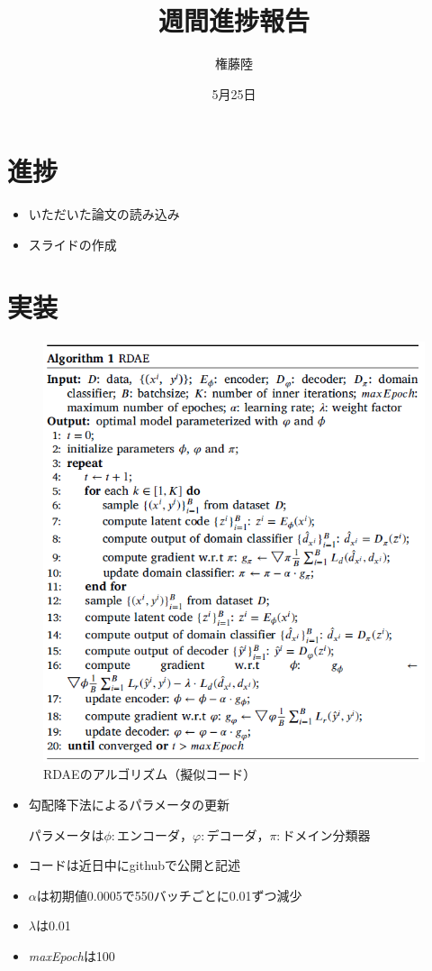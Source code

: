 \documentclass[dvipdfmx]{jsarticle}
\begin{document}
\title{週間進捗報告}
\author{権藤陸}
\date{5月25日}
\maketitle
\section{進捗}
\begin{itemize}
    \item いただいた論文の読み込み
    \item スライドの作成
\end{itemize}



\section{実装}

\begin{figure}[H]
\begin{center}
\includegraphics[width=0.6\linewidth]{./rdae_algorithm.png}
\end{center}
\caption{RDAEのアルゴリズム（擬似コード）}
\end{figure}
\begin{itemize}
    \item 勾配降下法によるパラメータの更新
    
パラメータは$\phi: エンコーダ$，$\varphi: デコーダ$，$\pi: ドメイン分類器$

    \item コードは近日中にgithubで公開と記述
    \item $\alpha$は初期値0.0005で550バッチごとに0.01ずつ減少
    \item $\lambda$は0.01
    \item \textit{maxEpoch}は100
\end{itemize}
\end{document}
